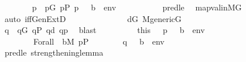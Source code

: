 \begin{isabellebody}
\ \ \ \ \ \ \isamarkupfalse%
\ p\ \ {\isachardoublequoteopen}p{\isasymin}G{\isachardoublequoteclose}\ {\isachardoublequoteopen}p{\isasymin}P{\isachardoublequoteclose}\ {\isachardoublequoteopen}p\ {\isasymtturnstile}\ {\isasymphi}\ {\isacharparenleft}{\kern0pt}{\isacharbrackleft}{\kern0pt}b{\isacharbrackright}{\kern0pt}\ {\isacharat}{\kern0pt}\ env{\isacharparenright}{\kern0pt}{\isachardoublequoteclose}\ \isanewline
\ \ \ \ \ \ \ \ \isamarkupfalse%
\ pred{\isacharunderscore}{\kern0pt}le{}\ \isamarkupfalse%
\ map{\isacharunderscore}{\kern0pt}val{\isacharunderscore}{\kern0pt}in{\isacharunderscore}{\kern0pt}MG\ \isamarkupfalse%
\ {\isacharparenleft}{\kern0pt}auto\ iff{\isacharcolon}{\kern0pt}GenExtD{\isacharparenright}{\kern0pt}\isanewline
\ \ \ \ \ \ \isamarkupfalse%
\isanewline
\ \ \ \ \ \ \isamarkupfalse%
\ {\isacartoucheopen}d{\isasymin}G{\isacartoucheclose}\ {\isacartoucheopen}M{\isacharunderscore}{\kern0pt}generic{\isacharparenleft}{\kern0pt}G{\isacharparenright}{\kern0pt}{\isacartoucheclose}\isanewline
\ \ \ \ \ \ \isamarkupfalse%
\isanewline
\ \ \ \ \ \ \isamarkupfalse%
\ q\ \ {\isachardoublequoteopen}q{\isasymin}G{\isachardoublequoteclose}\ {\isachardoublequoteopen}q{\isasymin}P{\isachardoublequoteclose}\ {\isachardoublequoteopen}q{\isasympreceq}d{\isachardoublequoteclose}\ {\isachardoublequoteopen}q{\isasympreceq}p{\isachardoublequoteclose}\ \isamarkupfalse%
\ blast\isanewline
\ \ \ \ \ \ \isamarkupfalse%
\ \isamarkupfalse%
\ this\ \ \ {\isacartoucheopen}p\ {\isasymtturnstile}\ {\isasymphi}\ {\isacharparenleft}{\kern0pt}{\isacharbrackleft}{\kern0pt}b{\isacharbrackright}{\kern0pt}\ {\isacharat}{\kern0pt}\ env{\isacharparenright}{\kern0pt}{\isacartoucheclose}\ \isanewline
\ \ \ \ \ \ \ \ Forall\ \ {\isacartoucheopen}b{\isasymin}M{\isacartoucheclose}\ {\isacartoucheopen}p{\isasymin}P{\isacartoucheclose}\isanewline
\ \ \ \ \ \ \isamarkupfalse%
\ {\isachardoublequoteopen}q\ {\isasymtturnstile}\ {\isasymphi}\ {\isacharparenleft}{\kern0pt}{\isacharbrackleft}{\kern0pt}b{\isacharbrackright}{\kern0pt}\ {\isacharat}{\kern0pt}\ env{\isacharparenright}{\kern0pt}{\isachardoublequoteclose}\isanewline
\ \ \ \ \ \ \ \ \isamarkupfalse%
\ pred{\isacharunderscore}{\kern0pt}le{}\ strengthening{\isacharunderscore}{\kern0pt}lemma\ \isamarkupfalse%

\end{isabellebody}
